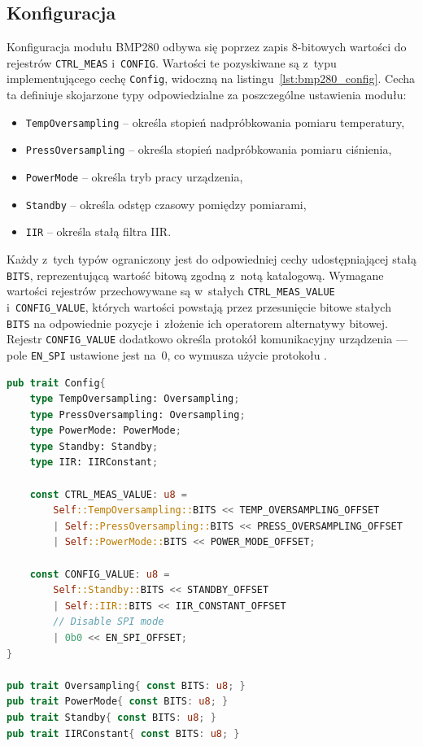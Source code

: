 \subsection*{Konfiguracja}
Konfiguracja modułu BMP280 odbywa się poprzez zapis 8-bitowych
wartości do rejestrów \texttt{CTRL\_MEAS} i~\texttt{CONFIG}. Wartości
te pozyskiwane są z~typu implementującego cechę \texttt{Config},
widoczną na listingu~\ref{lst:bmp280_config}. Cecha ta definiuje
skojarzone typy odpowiedzialne za poszczególne ustawienia modułu:
\begin{itemize}
    \item \texttt{TempOversampling} -- określa stopień nadpróbkowania
    pomiaru temperatury,
    \item \texttt{PressOversampling} -- określa stopień nadpróbkowania
    pomiaru ciśnienia,
    \item \texttt{PowerMode} -- określa tryb pracy urządzenia,
    \item \texttt{Standby} -- określa odstęp czasowy pomiędzy pomiarami,
    \item \texttt{IIR} -- określa stałą filtra IIR.
\end{itemize}

Każdy z~tych typów ograniczony jest do odpowiedniej cechy udostępniającej
stałą \texttt{BITS}, reprezentującą wartość bitową zgodną z~notą
katalogową. Wymagane wartości rejestrów przechowywane są w~stałych
\texttt{CTRL\_MEAS\_VALUE} i~\texttt{CONFIG\_VALUE}, których wartości
powstają przez przesunięcie bitowe stałych \texttt{BITS}
na odpowiednie pozycje i~złożenie ich operatorem alternatywy bitowej.
Rejestr \texttt{CONFIG\_VALUE} dodatkowo określa protokół komunikacyjny
urządzenia --- pole \texttt{EN\_SPI} ustawione jest na~0, co wymusza
użycie protokołu \isqrc.

\begin{lstlisting}[language=Rust, style=colouredRust, 
    caption={Cecha \texttt{Config} używana do konfiguracji BMP280},
    label={lst:bmp280_config}
]
pub trait Config{
    type TempOversampling: Oversampling;
    type PressOversampling: Oversampling;
    type PowerMode: PowerMode;
    type Standby: Standby;
    type IIR: IIRConstant;

    const CTRL_MEAS_VALUE: u8 = 
        Self::TempOversampling::BITS << TEMP_OVERSAMPLING_OFFSET
        | Self::PressOversampling::BITS << PRESS_OVERSAMPLING_OFFSET
        | Self::PowerMode::BITS << POWER_MODE_OFFSET;

    const CONFIG_VALUE: u8 =
        Self::Standby::BITS << STANDBY_OFFSET
        | Self::IIR::BITS << IIR_CONSTANT_OFFSET
        // Disable SPI mode
        | 0b0 << EN_SPI_OFFSET;
}

pub trait Oversampling{ const BITS: u8; }
pub trait PowerMode{ const BITS: u8; }
pub trait Standby{ const BITS: u8; }
pub trait IIRConstant{ const BITS: u8; }
\end{lstlisting}

